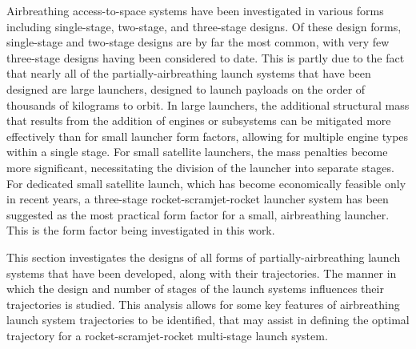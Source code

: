 Airbreathing access-to-space systems have been investigated in various forms including single-stage, two-stage, and three-stage designs. 
Of these design forms, single-stage and two-stage designs are by far the most common, with very few three-stage designs having been considered to date. This is partly due to the fact that nearly all of the partially-airbreathing launch systems that have been designed are large launchers, designed to launch payloads on the order of thousands of kilograms to orbit. In large launchers, the additional structural mass that results from the addition of engines or subsystems can be mitigated more effectively than for small launcher form factors, allowing for multiple engine types within a single stage. 
For small satellite launchers, the mass penalties become more significant, necessitating the division of the launcher into separate stages. 
For dedicated small satellite launch, which has become economically feasible only in recent years, a three-stage rocket-scramjet-rocket launcher system has been suggested as the most practical form factor for a small, airbreathing launcher. This is the form factor being investigated in this work. 

 



This section investigates the designs of all forms of partially-airbreathing launch systems that have been developed, along with their trajectories. The manner in which the design and number of stages of the launch systems influences their trajectories is studied. This analysis allows for some key features of airbreathing launch system trajectories to be identified, that may assist in defining the optimal trajectory for a rocket-scramjet-rocket multi-stage launch system.
  
 
  
  
  
  
  
  
  
